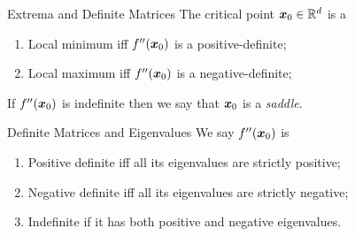 \documentclass[11pt,a4paper]{article}
\begin{document}
\subtitle{Theorem 15.10}{Extrema and Definite Matrices}
The critical point $\boldsymbol{x}_0 \in \mathbb{R}^d$ is a
\begin{enumerate}[label=\roman*)]
  \item Local minimum iff $f''(\boldsymbol{x}_0)$ is a positive-definite;
  \item Local maximum iff $f''(\boldsymbol{x}_0)$ is a negative-definite;
\end{enumerate}
If $f''(\boldsymbol{x}_0)$ is indefinite then we say that $\boldsymbol{x}_0$ is a \textit{saddle}.\\

\subtitle{Theorem 15.11 - }{Definite Matrices and Eigenvalues}
We say $f''(\boldsymbol{x}_0)$ is
\begin{enumerate}[label=\roman*)]
  \item Positive definite iff all its eigenvalues are strictly positive;
  \item Negative definite iff all its eigenvalues are strictly negative;
  \item Indefinite if it has both positive and negative eigenvalues.
\end{enumerate}
\end{document}
